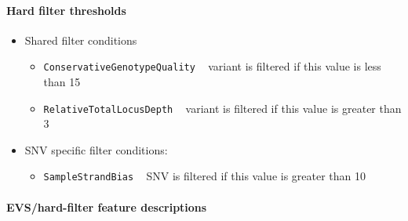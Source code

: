 \documentclass{article}
\begin{document}
\paragraph{Hard filter thresholds}

\begin{itemize}
    \item Shared filter conditions
    \begin{itemize}
        \item \texttt{ConservativeGenotypeQuality} ~ variant is filtered if this value is less than 15
        \item \texttt{RelativeTotalLocusDepth} ~ variant is filtered if this value is greater than 3
    \end{itemize}
    \item SNV specific filter conditions:
    \begin{itemize}
        \item \texttt{SampleStrandBias} ~ SNV is filtered if this value is greater than 10
    \end{itemize}
\end{itemize}

\paragraph{EVS/hard-filter feature descriptions}
\end{document}
